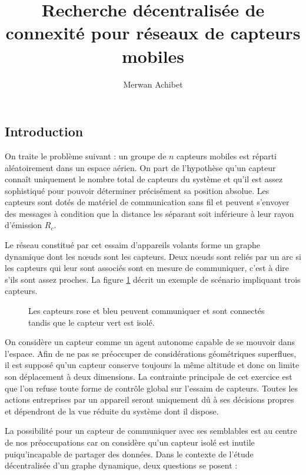 \documentclass[10pt]{article}
\title{Recherche décentralisée de connexité pour réseaux de capteurs mobiles}
\author{Merwan Achibet}
\date{}
\begin{document}
\maketitle

\begin{multicols}{2}

\section*{Introduction}

On traite le problème suivant : un groupe de $n$ capteurs mobiles est
réparti aléatoirement dans un espace aérien. On part de l'hypothèse
qu'un capteur connaît uniquement le nombre total de capteurs du
système et qu'il est assez sophistiqué pour pouvoir déterminer
précisément sa position absolue. Les capteurs sont dotés de matériel
de communication sans fil et peuvent s'envoyer des messages à
condition que la distance les séparant soit inférieure à leur rayon
d'émission $R_c$.

Le réseau constitué par cet essaim d'appareils volants forme un graphe
dynamique dont les n\oe uds sont les capteurs. Deux n\oe uds sont
reliés par un arc si les capteurs qui leur sont associés sont en
mesure de communiquer, c'est à dire s'ils sont assez proches. La
figure \ref{communication} décrit un exemple de scénario impliquant
trois capteurs.

\begin{figure}[H]

  \centering

  

  \caption{Les capteurs rose et bleu peuvent communiquer et sont
    connectés tandis que le capteur vert est isolé.}
  \label{communication}

\end{figure}

On considère un capteur comme un agent autonome capable de se mouvoir
dans l'espace. Afin de ne pas se préoccuper de considérations
géométriques superflues, il est supposé qu'un capteur conserve
toujours la même altitude et donc on limite son déplacement à deux
dimensions. La contrainte principale de cet exercice est que l'on
refuse toute forme de contrôle global sur l'essaim de capteurs. Toutes
les actions entreprises par un appareil seront uniquement dû à ses
décisions propres et dépendront de la vue réduite du système dont il
dispose.

La possibilité pour un capteur de communiquer avec ses semblables est
au centre de nos préoccupations car on considère qu'un capteur isolé
est inutile puiqu'incapable de partager des données. Dans le contexte
de l'étude décentralisée d'un graphe dynamique, deux questions se
posent :


\end{multicols}
\end{document}
